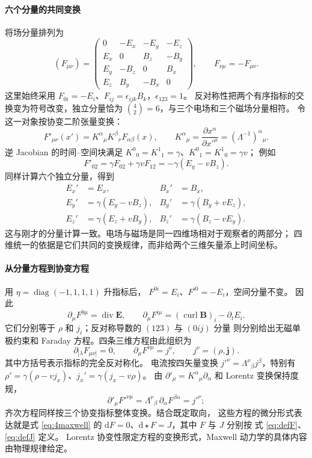 \documentclass[UTF8,11pt,openany]{ctexbook}
\numberwithin{equation}{chapter}
\theoremstyle{definition}
\theoremstyle{remark}
\newcommand{\dd}{\mathrm d}
\newcommand{\Div}{\operatorname{div}}
\newcommand{\curl}{\operatorname{curl}}
\begin{document}
\paragraph{六个分量的共同变换}
将场分量排列为
\[
(F_{\mu\nu})=
\begin{pmatrix}
0&-E_x&-E_y&-E_z\\
E_x&0&B_z&-B_y\\
E_y&-B_z&0&B_x\\
E_z&B_y&-B_x&0
\end{pmatrix},\qquad F_{\nu\mu}=-F_{\mu\nu}.
\]
这里始终采用 $F_{0i}=-E_i$、$F_{ij}=\epsilon_{ijk}B_k$，$\epsilon_{123}=1$。
反对称性把两个有序指标的交换变为符号改变，独立分量恰为
$\binom42=6$，与三个电场和三个磁场分量相符。
令这一对象按协变二阶张量变换：
\[
F'_{\mu\nu}(x')=K^\alpha{}_\mu K^\beta{}_\nu F_{\alpha\beta}(x),
\qquad K^\alpha{}_\mu=\frac{\partial x^\alpha}{\partial x'^\mu}
=(\Lambda^{-1})^\alpha{}_\mu.
\]
逆 Jacobian 的时间--空间块满足
$K^0{}_0=K^1{}_1=\gamma$、$K^0{}_1=K^1{}_0=\gamma v$；
例如
\[
F'_{02}=\gamma F_{02}+\gamma vF_{12}
=-\gamma(E_y-vB_z).
\]
同样计算六个独立分量，得到
\[
\boxed{\begin{aligned}
E_x'&=E_x,& B_x'&=B_x,\\
E_y'&=\gamma(E_y-vB_z),& B_y'&=\gamma(B_y+vE_z),\\
E_z'&=\gamma(E_z+vB_y),& B_z'&=\gamma(B_z-vE_y).
\end{aligned}}
\]
这与刚才的分量计算一致。电场与磁场是同一四维场相对于观察者的两部分；
四维统一的依据是它们共同的变换规律，而非给两个三维矢量添上时间坐标。

\paragraph{从分量方程到协变方程}
用 $\eta=\operatorname{diag}(-1,1,1,1)$ 升指标后，
$F^{0i}=E_i$、$F^{i0}=-E_i$，空间分量不变。
因此
\[
\partial_\mu F^{0\mu}=\Div\bm E,\qquad
\partial_\mu F^{i\mu}=(\curl\bm B)_i-\partial_tE_i.
\]
它们分别等于 $\rho$ 和 $j_i$；反对称导数的 $(123)$ 与 $(0ij)$ 分量
则分别给出无磁单极约束和 Faraday 方程。四条三维方程由此组织为
\[
\partial_{[\lambda}F_{\mu\nu]}=0,\qquad
\partial_\mu F^{\nu\mu}=j^\nu,\qquad j^\nu=(\rho,\bm j).
\]
其中方括号表示指标的完全反对称化。
电流按四矢量变换 $j'^\nu=\Lambda^\nu{}_\beta j^\beta$，特别有
$\rho'=\gamma(\rho-vj_x)$、$j_x'=\gamma(j_x-v\rho)$。
由 $\partial'_\mu=K^\alpha{}_\mu\partial_\alpha$ 和 Lorentz 变换保持度规，
\[
\partial'_\mu F'^{\nu\mu}
=\Lambda^\nu{}_\beta\,\partial_\alpha F^{\beta\alpha}
=j'^\nu;
\]
齐次方程同样按三个协变指标整体变换。结合既定取向，
这些方程的微分形式表达就是式 \eqref{eq:4maxwell} 的
$\dd F=0$、$\dd\star F=J$，其中 $F$ 与 $J$ 分别按
式 \eqref{eq:defF}、\eqref{eq:defJ} 定义。
Lorentz 协变性限定方程的变换形式，Maxwell 动力学的具体内容由物理规律给定。
\end{document}
